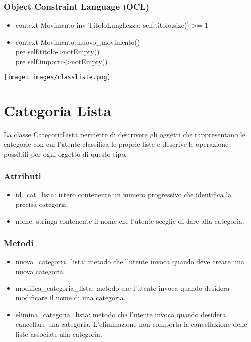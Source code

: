 \documentclass[a4paper,12pt]{article}
\begin{document}
\subsubsection*{Object Constraint Language (OCL)}
\begin{itemize}
\item {\ttfamily context Movimento inv TitoloLunghezza: self.titolo.size() >= 1}
\item {\ttfamily context Movimento::nuovo\_movimento() \\pre self.titolo->notEmpty() \\pre self.importo->notEmpty()}

\end{itemize}

\newpage

\begin{center}
  \texttt{[image: images/classliste.png]}
\end{center}
\section{Categoria Lista}

La classe {\sffamily CategoriaLista} permette di descrivere gli oggetti che rappresentano le categorie con cui l'utente classifica le proprie liste e descrive le operazione possibili per ogni oggetto di questo tipo.
\subsubsection*{Attributi}
\begin{itemize} \setlength\itemsep{0.01em}
\item {\ttfamily id\_cat\_lista}: intero contenente un numero progressivo che identifica la precisa categoria.
\item {\ttfamily nome}: stringa contenente il nome che l'utente sceglie di dare alla categoria.
\end{itemize}
\subsubsection*{Metodi}
\begin{itemize} \setlength\itemsep{0.01em}
\item {\ttfamily nuova\_categoria\_lista}: metodo che l'utente invoca quando deve creare una nuova categoria.
\item {\ttfamily modifica\_categoria\_lista}: metodo che l'utente invoca quando desidera modificare il nome di una categoria.
\item {\ttfamily elimina\_categoria\_lista}: metodo che l'utente invoca quando desidera cancellare una categoria. L'eliminazione non comporta la cancellazione delle liste associate alla categoria.
\end{itemize}
\end{document}
